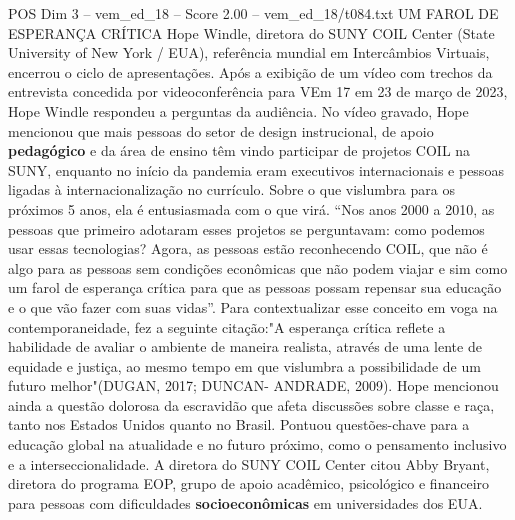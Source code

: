 \begin{textsample}{POS Dim 3 – vem\_ed\_18 – Score 2.00 – vem\_ed\_18/t084.txt}  \label{ex:f3_pos_136}
UM FAROL DE ESPERANÇA CRÍTICA Hope Windle, diretora do SUNY COIL Center (State University of New York / EUA), referência mundial em Intercâmbios Virtuais, encerrou o ciclo de apresentações.
Após a exibição de um vídeo com trechos da entrevista concedida por videoconferência para VEm 17 em 23 de março de 2023, Hope Windle respondeu a perguntas da audiência.
No vídeo gravado, Hope mencionou que mais pessoas do setor de design instrucional, de apoio \textbf{pedagógico} e da área de ensino têm vindo participar de projetos COIL na SUNY, enquanto no início da pandemia eram executivos internacionais e pessoas ligadas à internacionalização no currículo.
Sobre o que vislumbra para os próximos 5 anos, ela é entusiasmada com o que virá. “Nos anos 2000 a 2010, as pessoas que primeiro adotaram esses projetos se perguntavam: como podemos usar essas tecnologias?
Agora, as pessoas estão reconhecendo COIL, que não é algo para as pessoas sem condições econômicas que não podem viajar e sim como um farol de esperança crítica para que as pessoas possam repensar sua educação e o que vão fazer com suas vidas”.
Para contextualizar esse conceito em voga na contemporaneidade, fez a seguinte citação:"A esperança crítica reflete a habilidade de avaliar o ambiente de maneira realista, através de uma lente de equidade e justiça, ao mesmo tempo em que vislumbra a possibilidade de um futuro melhor"(DUGAN, 2017; DUNCAN- ANDRADE, 2009).
Hope mencionou ainda a questão dolorosa da escravidão que afeta discussões sobre classe e raça, tanto nos Estados Unidos quanto no Brasil.
Pontuou questões-chave para a educação global na atualidade e no futuro próximo, como o pensamento inclusivo e a interseccionalidade.
A diretora do SUNY COIL Center citou Abby Bryant, diretora do programa EOP, grupo de apoio acadêmico, psicológico e financeiro para pessoas com dificuldades \textbf{socioeconômicas} em universidades dos EUA.

\end{textsample}
